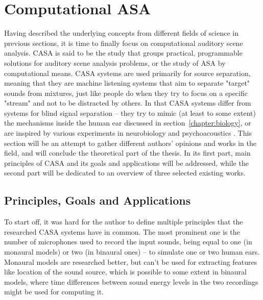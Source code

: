 \section{Computational ASA}\label{chapter:casa}

Having described the underlying concepts from different fields of science in previous sections, it is time to finally focus on computational auditory scene analysis. CASA is said to be the study that groups practical, programmable solutions for auditory scene analysis problems, or the study of ASA by computational means. CASA systems are used primarily for source se\-pa\-ra\-tion, meaning that they are machine listening systems that aim to separate "target" sounds from mixtures, just like people do when they try to focus on a specific "stream" and not to be distracted by others. In that CASA systems differ from systems for blind signal separation – they try to mimic (at least to some extent) the mechanisms inside the human ear discussed in section~\ref{chapter:biology}, or are inspired by various experiments in neurobiology and psychoacoustics \cite{VanDerKouwe2001}. This section will be an attempt to gather different authors' opinions and works in the field, and will conclude the theoretical part of the thesis. In its first part, main principles of CASA and its goals and applications will be addressed, while the second part will be dedicated to an overview of three selected existing works.

\subsection{Principles, Goals and Applications}

To start off, it was hard for the author to define multiple principles that the researched CASA systems have in common. The most prominent one is the number of microphones used to record the input sounds, being equal to one (in monaural models) or two (in binaural ones) -- to simulate one or two human ears. Monaural models are researched better, but can't be used for extracting features like location of the sound source, which is possible to some extent in binaural models, where time differences between sound energy levels in the two recordings might be used for computing it.\\

